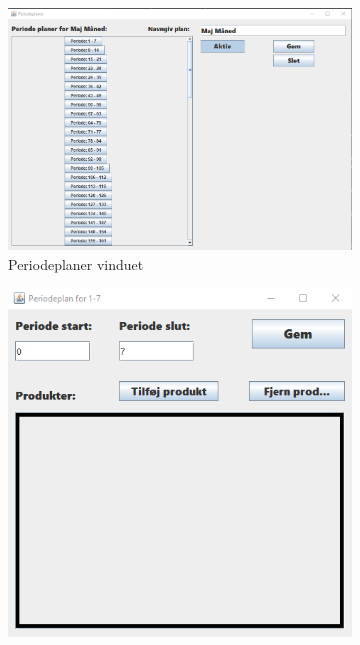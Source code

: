 \begin{figure}[tb]
    \centering
    \begin{subfigure}[b]{0.475\textwidth}
        \centering
        \includegraphics[width=\textwidth]{figures/implementation/UI/periodeplaner.png}
        \caption{Periodeplaner vinduet}
        \label{fig:periodeplaner}
    \end{subfigure}
    \hfill
    \begin{subfigure}[b]{0.475\textwidth}
        \centering 
        \includegraphics[width=\textwidth]{figures/implementation/UI/periodeplan.png}

\end{subfigure}
\end{figure}

